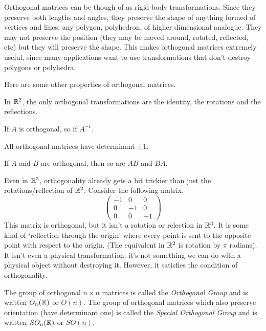 \documentclass[fleqn]{report}
\begin{document}
Orthogonal matrices can be though of as rigid-body
transformations. Since they preserve both lengths and angles,
they preserve the shape of anything formed of vertices and
lines: any polygon, polyhedron, of higher dimensional
analogue. They may not preserve the position (they
may be moved around, rotated, reflected, etc) but they will
preserve the shape. This makes orthogonal matrices
extremely useful, since many applications want to use
transformations that don't destroy polygons or polyhedra.

\begin{prop}
Here are some other properties of orthogonal matrices.
\begin{smallitemize}
\item In $\mathbb{R}^2$, the only orthogonal transformations are the
identity, the rotations and the reflections.
\item If $A$ is orthogonal, so if $A^{-1}$.
\item All orthogonal matrices have determinant $\pm 1$.
\item If $A$ and $B$ are orthogonal, then so are $AB$ and
$BA$. 
\end{smallitemize}
\end{prop}

Even in $\mathbb{R}^3$, orthogonality already gets a bit trickier
than just the rotations/reflection of $\mathbb{R}^2$. Consider
the following matrix.
\begin{equation*}
\left( \begin{matrix}
-1 & 0 & 0 \\
0 & -1 & 0 \\
0 & 0 & -1 
\end{matrix} \right) 
\end{equation*}
This matrix is orthogonal, but it isn't a rotation or
relection in $\mathbb{R}^3$. It is some kind of
`reflection through the origin' where every point is sent to
the opposite point with respect to the origin. (The
equivalent in $\mathbb{R}^2$ is rotation by $\pi$ radians). It isn't
even a physical transformation: it's not something we can do
with a physical object without destroying it. However, it
satisfies the condition of orthogonality.

\begin{defn}
The group of orthogonal $n \times n$ matrices is called the
\emph{Orthogonal Group} and is written $O_n(\mathbb{R})$ or 
$O(n)$. The group of
orthogonal matrices which also preserve orientation (have
determinant one) is called the \emph{Special
Orthogonal Group} and is written $SO_n(\mathbb{R})$ or $SO(n)$.
\end{defn}
\end{document}
